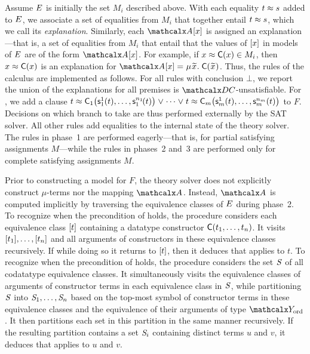 Assume $E$ is initially the set $M_i$ described above. With each equality $t \approx s$ added
to $E$, we associate a set of equalities from $M_i$ that together entail $t
\approx s$, which we call its \emph{explanation}.
Similarly, each $\Val \ec{x}$ is assigned an explanation---that is, a set
of equalities from $M_i$ that entail that the values of $[x]$ in models of
$E$ are of the form $\Val \ec{x}$. For example, if $x \approx \textsf{C}( x ) \in
M_i$, then $x \approx \textsf{C}( x )$ is an %
explanation for $\Val \ec{x} = \MU {\Varec{x}}.\; \const{C}( {\Varec{x}} )$.
Thus, the rules of the calculus are implemented as follows. For all rules with
conclusion $\bot$, we report the union of the explanations for all premises is
$\thD$-unsatisfiable. For , we add a clause %
$t \approx \textsf{C}_1\bigl( \textsf{s}^1_1( t ), \ldots, \textsf{s}^{n_{1\!}}_1( t ) \bigr)
\mathrel\lor \cdots \mathrel\lor t \approx \textsf{C}_m\bigl( \textsf{s}^1_m( t ),
\ldots, \textsf{s}^{n_m}_m( t ) \bigr)$ to $F$.
Decisions on which branch to take are thus performed externally by the SAT
solver. %
All other rules add equalities to the
internal state of the theory solver. The rules in phase~1 are performed
eagerly---that is, for partial satisfying assignments $M$---while the rules in
phases~2 and~3 are performed only for complete satisfying
assignments $M$. 

Prior to constructing a model for $F\!$, the theory solver does not explicitly construct $\mu$-terms nor the mapping $\Val$.
Instead, $\Val$ is computed implicitly by traversing the equivalence classes of $E$ during phase~2.
To recognize when the precondition of  holds,
the procedure considers each equivalence class $[t]$ containing a datatype constructor $\textsf{C}( t_1, \ldots, t_n )$.
It visits $[t_1], \ldots, [t_n]$ and all arguments of constructors in these equivalence classes recursively.
If while doing so it returns to $[t]$, then it deduces that  applies to $t$.
To recognize when the precondition of  holds,
the procedure considers the set $\mathit{S}$ of all codatatype equivalence classes.
It simultaneously visits the equivalence classes of arguments of constructor terms in each equivalence class in $\mathit{S}$,
while partitioning $\mathit{S}$ into $\mathit{S}_1, \ldots, \mathit{S}_n$ based on the top-most symbol of constructor terms in these equivalence classes
and the equivalence of their arguments of type $\Nondata$.
It then partitions each set in this partition in the same manner recursively.
If %
the resulting partition contains a set $\mathit{S}_i$ containing distinct terms $u$
and $v$, it deduces that  applies to $u$ and $v$.

